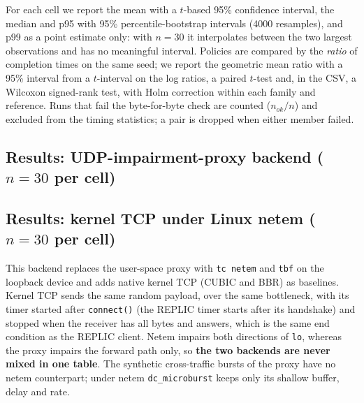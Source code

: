 For each cell we report the mean with a $t$-based 95\% confidence interval, the median and p95 with 95\% percentile-bootstrap intervals
(4000 resamples), and p99 as a point estimate only: with $n=30$ it interpolates between the two largest observations and has no meaningful interval.
Policies are compared by the \emph{ratio} of completion times on the same seed; we report the geometric mean ratio with a 95\% interval from a
$t$-interval on the log ratios, a paired $t$-test and, in the CSV, a Wilcoxon signed-rank test, with Holm correction within each family and reference.
Runs that fail the byte-for-byte check are counted ($n_{ok}/n$) and excluded from the timing statistics; a pair is dropped when either member failed.

\subsection{Results: UDP-impairment-proxy backend ($n=30$ per cell)}

\subsection{Results: kernel TCP under Linux netem ($n=30$ per cell)}
\label{sec:kerneltcp}
This backend replaces the user-space proxy with \texttt{tc netem} and \texttt{tbf} on the loopback device and adds native kernel TCP (CUBIC and BBR) as
baselines. Kernel TCP sends the same random payload, over the same bottleneck, with its timer started after \texttt{connect()} (the REPLIC timer starts after
its handshake) and stopped when the receiver has all bytes and answers, which is the same end condition as the REPLIC client. Netem impairs both directions of
\texttt{lo}, whereas the proxy impairs the forward path only, so \textbf{the two backends are never mixed in one table}. The synthetic cross-traffic bursts of the proxy have
no netem counterpart; under netem \texttt{dc\_microburst} keeps only its shallow buffer, delay and rate.

